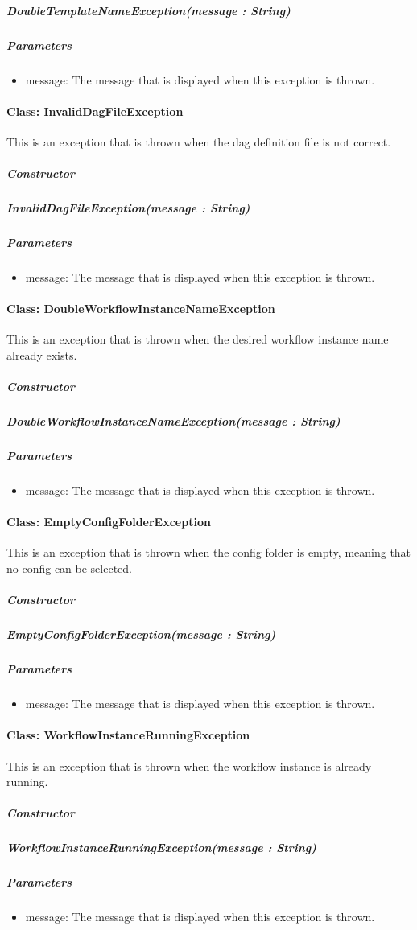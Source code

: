 \subparagraph{DoubleTemplateNameException(message : String)}
\subparagraph{Parameters}
\begin{itemize}
    \item{message:}
    The message that is displayed when this exception is thrown.
\end{itemize}


\paragraph{Class: InvalidDagFileException}
This is an exception that is thrown when the dag definition file is not correct.
\subparagraph{Constructor}

\subparagraph{InvalidDagFileException(message : String)}
\subparagraph{Parameters}
\begin{itemize}
    \item{message:}
    The message that is displayed when this exception is thrown.
\end{itemize}


\paragraph{Class: DoubleWorkflowInstanceNameException}
This is an exception that is thrown when the desired workflow instance name already exists.
\subparagraph{Constructor}

\subparagraph{DoubleWorkflowInstanceNameException(message : String)}
\subparagraph{Parameters}
\begin{itemize}
    \item{message:}
    The message that is displayed when this exception is thrown.
\end{itemize}


\paragraph{Class: EmptyConfigFolderException}
This is an exception that is thrown when the config folder is empty, meaning that no config can be selected.
\subparagraph{Constructor}

\subparagraph{EmptyConfigFolderException(message : String)}
\subparagraph{Parameters}
\begin{itemize}
    \item{message:}
    The message that is displayed when this exception is thrown.
\end{itemize}


\paragraph{Class: WorkflowInstanceRunningException}
This is an exception that is thrown when the workflow instance is already running.
\subparagraph{Constructor}

\subparagraph{WorkflowInstanceRunningException(message : String)}
\subparagraph{Parameters}
\begin{itemize}
    \item{message:}
    The message that is displayed when this exception is thrown.
\end{itemize}


